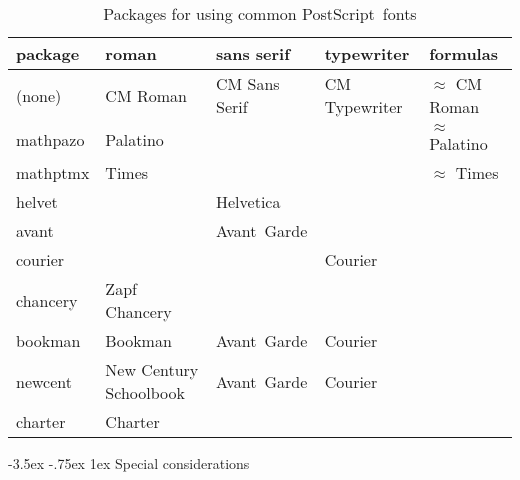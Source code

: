 \documentclass[11pt]{ltxguide}[1995/11/28]
\makeatletter
\renewcommand\section{\@startsection{section}{1}{\z@}%
{-3.5ex \@plus -.75ex}%
{1ex}%
{\normalfont\Large\bfseries}}
\newcommand{\ps}{PostScript}
\newcommand{\Lpack}[1]{\textsf{#1}}
\makeatother
\begin{document}
\begin{table}[h!]
\caption{Packages for using common \ps\ fonts}
\label{tab:packages}
\medskip
{\footnotesize
\begin{center}
\renewcommand{\arraystretch}{1.2}
\begin{tabular}{|l|p{1.8cm}p{2.2cm}p{2.4cm}p{2.2cm}|}
\hline
\textbf{package} & \textbf{roman}  & \textbf{sans serif} & \textbf{typewriter} & \textbf{formulas} \\\hline\hline
(none)           & CM Roman        & CM Sans Serif       & CM Typewriter       & $\approx$ CM Roman\\\hline
\Lpack{mathpazo} & Palatino 
                 &
                 &
                 & $\approx$ Palatino\\\hline
\Lpack{mathptmx} & Times  
                 &
                 &
                 & $\approx$ Times\\\hline
\Lpack{helvet}   & 
                 & Helvetica
                 &
                 & \\\hline
\Lpack{avant}    & 
                 & Avant~Garde
                 &
                 & \\\hline
\Lpack{courier}  &
                 &
                 & Courier 
                 & \\\hline
\Lpack{chancery} & Zapf Chancery
                 & 
                 & 
                 & \\\hline
\Lpack{bookman}  & Bookman
                 & Avant~Garde
                 & Courier
                 & \\\hline
\Lpack{newcent}  & New Century Schoolbook
                 & Avant~Garde
                 & Courier
                 & \\\hline
\Lpack{charter}  & Charter
                 & 
                 & 
                 & \\\hline
\end{tabular}
\end{center}
}
\end{table}



\section{Special considerations}
\end{document}

